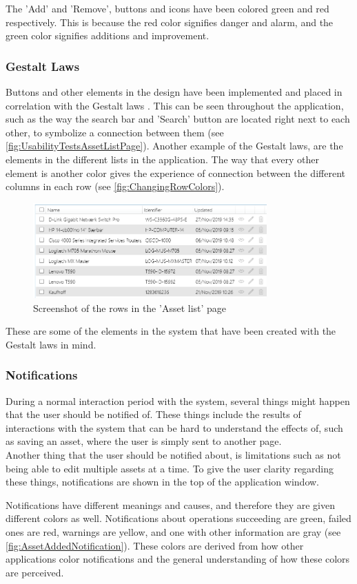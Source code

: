 The 'Add' and 'Remove', buttons and icons have been colored green and red respectively. This is because the red color signifies danger and alarm, and the green color signifies additions and improvement.

\subsubsection*{Gestalt Laws}
Buttons and other elements in the design have been implemented and placed in correlation with the Gestalt laws \citep{GestaltLaws}. This can be seen throughout the application, such as the way the search bar and 'Search' button are located right next to each other, to symbolize a connection between them (see \autoref{fig:UsabilityTestsAssetListPage}). Another example of the Gestalt laws, are the elements in the different lists in the application. The way that every other element is another color gives the experience of connection between the different columns in each row (see \autoref{fig:ChangingRowColors}).

\begin{figure}[H]
    \centering
    \includegraphics[width=0.8\textwidth]{figures/UIDesignElements/DifferentColoredRows.png}
    \caption{Screenshot of the rows in the 'Asset list' page}
    \label{fig:ChangingRowColors}
\end{figure}

These are some of the elements in the system that have been created with the Gestalt laws in mind.

\subsubsection*{Notifications}
During a normal interaction period with the system, several things might happen that the user should be notified of. These things include the results of interactions with the system that can be hard to understand the effects of, such as saving an asset, where the user is simply sent to another page. \\
Another thing that the user should be notified about, is limitations such as not being able to edit multiple assets at a time. To give the user clarity regarding these things, notifications are shown in the top of the application window.
\par
Notifications have different meanings and causes, and therefore they are given different colors as well. Notifications about operations succeeding are green, failed ones are red, warnings are yellow, and one with other information are gray (see \autoref{fig:AssetAddedNotification}). These colors are derived from how other applications color notifications and the general understanding of how these colors are perceived.

